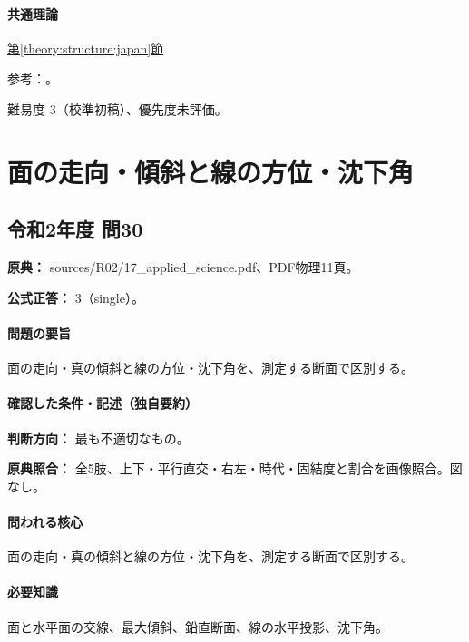 \paragraph{共通理論} \hyperref[theory:structure:japan]{第\ref*{theory:structure:japan}節}

\par 参考：\cite{str_ryoke}。

\par 難易度 3（校準初稿）、優先度未評価。

\section{面の走向・傾斜と線の方位・沈下角}

\subsection{令和2年度 問30}
\label{q:r02-reg-applied-30}

\noindent\textbf{原典：} sources/R02/17\_applied\_science.pdf、PDF物理11頁。

\textbf{公式正答：} 3（single）。

\paragraph{問題の要旨} 面の走向・真の傾斜と線の方位・沈下角を、測定する断面で区別する。

\paragraph{確認した条件・記述（独自要約）}\mbox{}\par

\noindent\textbf{判断方向：} 最も不適切なもの。\par

\noindent\textbf{原典照合：} 全5肢、上下・平行直交・右左・時代・固結度と割合を画像照合。図なし。\par

\paragraph{問われる核心} 面の走向・真の傾斜と線の方位・沈下角を、測定する断面で区別する。

\paragraph{必要知識} 面と水平面の交線、最大傾斜、鉛直断面、線の水平投影、沈下角。

